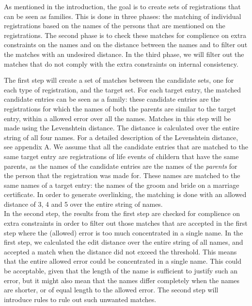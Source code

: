 As mentioned in the introduction, the goal is to create sets of registrations that can be seen as families. This is done in three phases: the matching of individual registrations based on the names of the persons that are mentioned on the registrations. The second phase is to check these matches for complience on extra constraints on the names and on the distance between the names and to filter out the matches with an undesired distance. In the third phase, we will filter out the matches that do not comply with the extra constraints on internal consistency. \newline

The first step will create a set of matches between the candidate sets, one for each type of registration, and the target set. For each target entry, the matched candidate entries can be seen as a family: these candidate entries are the registrations for which the names of both the parents are similar to the target entry, within a allowed error over all the names. Matches in this step will be made using the Levenshtein distance. The distance is calculated over the entire string of all four names. For a detailed description of the Levenshtein distance, see appendix A. We assume that all the candidate entries that are matched to the same target entry are registrations of life events of childern that have the same parents, as the names of the candidate entries are the names of the \textit{parents} for the person that the registration was made for. These names are matched to the same names of a target entry: the names of the groom and  bride on a marriage certificate. In order to generate overlinking, the matching is done with an allowed distance of 3, 4 and 5 over the entire string of names.\\

In the second step, the results from the first step are checked for complience on extra constraints in order to filter out those matches that are accepted in the first step where the (allowed) error is too much concentrated in a single name. In the first step, we calculated the edit distance over the entire string of all names, and accepted a match when the distance did not exceed the threshold. This means that the entire allowed error could be concentrated in a single name. This could be acceptable, given that the length of the name is sufficient to justify such an error, but it might also mean that the names differ completely when the names are shorter, or of equal length to the allowed error. The second step will introduce rules to rule out such unwanted matches.\newline

